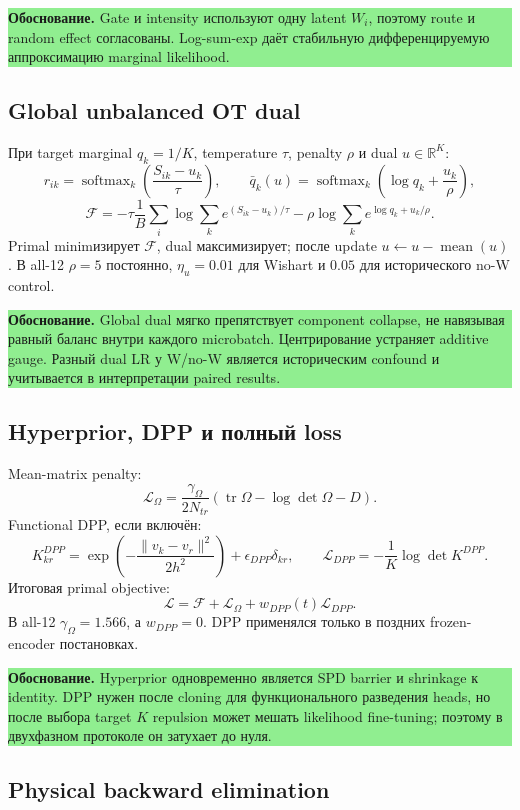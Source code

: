 \documentclass[11pt,a4paper]{article}
\newcommand{\R}{\mathbb{R}}
\newcommand{\boxnote}[2]{%
  \begin{center}\setlength{\fboxsep}{9pt}%
  \colorbox{#1}{\begin{minipage}{0.94\textwidth}\raggedright #2\par\end{minipage}}
  \end{center}}
\newcommand{\rationale}[1]{\boxnote{lightgreen}{\textbf{Обоснование.} #1}}
\begin{document}
\rationale{Gate и intensity используют одну latent $W_i$, поэтому route и
random effect согласованы. Log-sum-exp даёт стабильную дифференцируемую
аппроксимацию marginal likelihood.}

\subsection{Global unbalanced OT dual}

При target marginal $q_k=1/K$, temperature $\tau$, penalty $\rho$ и dual
$u\in\R^K$:
\[
r_{ik}=\operatorname{softmax}_k\left(\frac{S_{ik}-u_k}{\tau}\right),
\qquad
\bar q_k(u)=\operatorname{softmax}_k\left(\log q_k+\frac{u_k}{\rho}\right),
\]
\[
\mathcal F=-\tau\frac1B\sum_i\log\sum_k e^{(S_{ik}-u_k)/\tau}
-\rho\log\sum_k e^{\log q_k+u_k/\rho}.
\]
Primal minimизирует $\mathcal F$, dual максимизирует; после update
$u\leftarrow u-\operatorname{mean}(u)$. В all-12 $\rho=5$ постоянно,
$\eta_u=0.01$ для Wishart и $0.05$ для исторического no-W control.

\rationale{Global dual мягко препятствует component collapse, не навязывая
равный баланс внутри каждого microbatch. Центрирование устраняет additive
gauge. Разный dual LR у W/no-W является историческим confound и учитывается в
интерпретации paired results.}

\subsection{Hyperprior, DPP и полный loss}

Mean-matrix penalty:
\[
\mathcal L_{\Omega}=\frac{\gamma_\Omega}{2N_{tr}}
(\operatorname{tr}\Omega-\log\det\Omega-D).
\]
Functional DPP, если включён:
\[
K^{DPP}_{kr}=\exp\left(-\frac{\|v_k-v_r\|^2}{2h^2}\right)
+\epsilon_{DPP}\delta_{kr},\qquad
\mathcal L_{DPP}=-\frac1K\log\det K^{DPP}.
\]
Итоговая primal objective:
\[
\mathcal L=\mathcal F+\mathcal L_{\Omega}+w_{DPP}(t)\mathcal L_{DPP}.
\]
В all-12 $\gamma_\Omega=1.566$, а $w_{DPP}=0$. DPP применялся только в
поздних frozen-encoder постановках.

\rationale{Hyperprior одновременно является SPD barrier и shrinkage к identity.
DPP нужен после cloning для функционального разведения heads, но после выбора
target $K$ repulsion может мешать likelihood fine-tuning; поэтому в двухфазном
протоколе он затухает до нуля.}

\subsection{Physical backward elimination}
\end{document}
